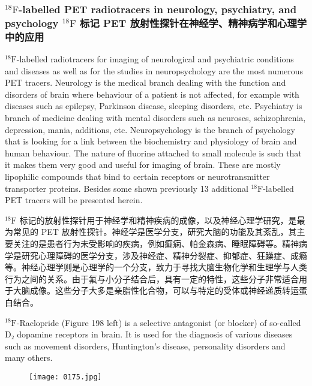\documentclass[dvipsnames, svgnames,a4paper,11pt]{article}
\begin{document}
\subsubsection{${}^\mathrm{18}\mathrm{F}$-labelled PET radiotracers in neurology, psychiatry, and psychology ${}^\mathrm{18}\mathrm{F}$ 标记 PET 放射性探针在神经学、精神病学和心理学中的应用}

${}^\mathrm{18}\mathrm{F}$-labelled radiotracers for imaging of neurological and psychiatric conditions and
diseases as well as for the studies in neuropsychology are the most numerous PET
tracers. Neurology is the medical branch dealing with the function and disorders of
brain where behaviour of a patient is not affected, for example with diseases such as
epilepsy, Parkinson disease, sleeping disorders, etc. Psychiatry is branch of
medicine dealing with mental disorders such as neuroses, schizophrenia, depression,
mania, additions, etc. Neuropsychology is the branch of psychology that is looking
for a link between the biochemistry and physiology of brain and human behaviour.
The nature of fluorine attached to small molecule is such that it makes them very
good and useful for imaging of brain. These are mostly lipophilic compounds that
bind to certain receptors or neurotransmitter transporter proteins. Besides some
shown previously 13 additional ${}^\mathrm{18}\mathrm{F}$-labelled PET tracers will be presented herein.

${}^\mathrm{18}\mathrm{F}$ 标记的放射性探针用于神经学和精神疾病的成像，以及神经心理学研究，是最为常见的 PET 放射性探针。神经学是医学分支，研究大脑的功能及其紊乱，其主要关注的是患者行为未受影响的疾病，例如癫痫、帕金森病、睡眠障碍等。精神病学是研究心理障碍的医学分支，涉及神经症、精神分裂症、抑郁症、狂躁症、成瘾等。神经心理学则是心理学的一个分支，致力于寻找大脑生物化学和生理学与人类行为之间的关系。由于氟与小分子结合后，具有一定的特性，这些分子非常适合用于大脑成像。这些分子大多是亲脂性化合物，可以与特定的受体或神经递质转运蛋白结合。

${}^\mathrm{18}\mathrm{F}$-Raclopride (Figure 198 left) is a selective antagonist (or blocker) of so-called D₂
dopamine receptors in brain. It is used for the diagnosis of various diseases such as
movement disorders, Huntington’s disease, personality disorders and many others. 

\begin{figure}[h]
	\centering
    \texttt{[image: 0175.jpg]}   
     \label{fig198}
\end{figure}
\end{document}
